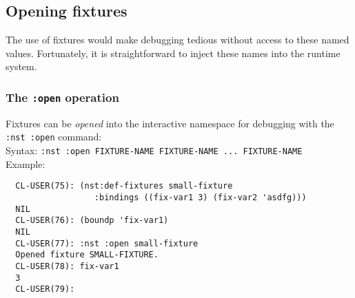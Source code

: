 \subsection{Opening fixtures}
The use of fixtures would make debugging tedious without access to
these named values.  Fortunately, it is straightforward to inject
these names into the runtime system.

\subsubsection{The \texttt{:open} operation}
%
Fixtures can be \emph{opened} into the
interactive namespace for debugging with the
\texttt{:nst~:open} command:
\\ Syntax: \texttt{:nst :open FIXTURE-NAME FIXTURE-NAME ... FIXTURE-NAME}
\\ Example:
\begin{verbatim}
  CL-USER(75): (nst:def-fixtures small-fixture
                  :bindings ((fix-var1 3) (fix-var2 'asdfg)))
  NIL
  CL-USER(76): (boundp 'fix-var1)
  NIL
  CL-USER(77): :nst :open small-fixture
  Opened fixture SMALL-FIXTURE.
  CL-USER(78): fix-var1
  3
  CL-USER(79): 
\end{verbatim}

